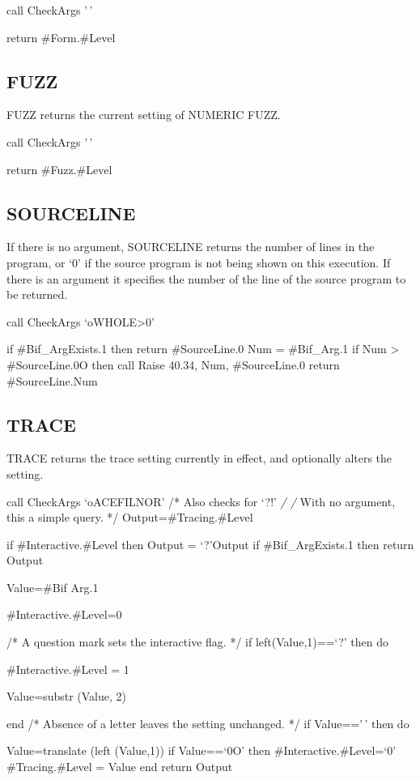 call CheckArgs '\,'

return \#Form.\#Level

\subsection{FUZZ}\label{fuzz}

FUZZ returns the current setting of NUMERIC FUZZ.

call CheckArgs '\,'

return \#Fuzz.\#Level

\subsection{SOURCELINE}\label{sourceline}

If there is no argument, SOURCELINE returns the number of lines in the
program, or `0' if the source program is not being shown on this
execution. If there is an argument it specifies the number of the line
of the source program to be returned.

call CheckArgs `oWHOLE\textgreater0'

if \#Bif\_ArgExists.1 then return \#SourceLine.0 Num = \#Bif\_Arg.1 if
Num \textgreater{} \#SourceLine.0O then call Raise 40.34, Num,
\#SourceLine.0 return \#SourceLine.Num

\subsection{TRACE}\label{trace}

TRACE returns the trace setting currently in effect, and optionally
alters the setting.

call CheckArgs `oACEFILNOR' /* Also checks for `?!' \emph{/ /} With no
argument, this a simple query. */ Output=\#Tracing.\#Level

if \#Interactive.\#Level then Output = `?'\textbar\textbar Output if
\#Bif\_ArgExists.1 then return Output

Value=\#Bif Arg.1

\#Interactive.\#Level=0

/* A question mark sets the interactive flag. */ if left(Value,1)==`?'
then do

\#Interactive.\#Level = 1

Value=substr (Value, 2)

end /* Absence of a letter leaves the setting unchanged. */ if
Value=='\,' then do

Value=translate (left (Value,1)) if Value==`0O' then
\#Interactive.\#Level=`0' \#Tracing.\#Level = Value end return Output

